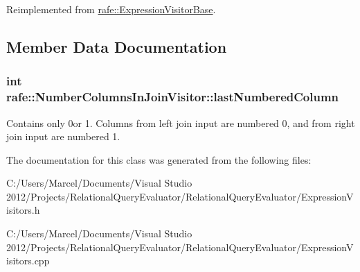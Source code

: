 Reimplemented from \hyperlink{classrafe_1_1_expression_visitor_base_a4eaa77bf4105d1cbdde4feb047228255}{rafe\+::\+Expression\+Visitor\+Base}.



\subsection{Member Data Documentation}
\hypertarget{classrafe_1_1_number_columns_in_join_visitor_a332114b3e616548b03a47c34e65f386a}{
\subsubsection[{last\+Numbered\+Column}]{\setlength{\rightskip}{0pt plus 5cm}int rafe\+::\+Number\+Columns\+In\+Join\+Visitor\+::last\+Numbered\+Column}}\label{classrafe_1_1_number_columns_in_join_visitor_a332114b3e616548b03a47c34e65f386a}
Contains only 0or 1. Columns from left join input are numbered 0, and from right join input are numbered 1. 

The documentation for this class was generated from the following files\+:\begin{DoxyCompactItemize}
\item 
C\+:/\+Users/\+Marcel/\+Documents/\+Visual Studio 2012/\+Projects/\+Relational\+Query\+Evaluator/\+Relational\+Query\+Evaluator/Expression\+Visitors.\+h\item 
C\+:/\+Users/\+Marcel/\+Documents/\+Visual Studio 2012/\+Projects/\+Relational\+Query\+Evaluator/\+Relational\+Query\+Evaluator/Expression\+Visitors.\+cpp\end{DoxyCompactItemize}
